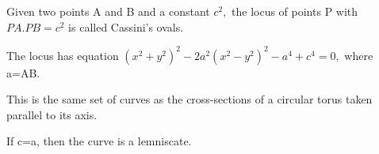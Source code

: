 Given two points A and B and a constant $c^{2},$  the locus of points P
with $PA.PB=c^{2}$  is called Cassini's ovals.
\par
The locus has equation $(x^{2}+y^{2})^{2}-2a^{2}(x^{2}-y^{2})^{2}-a^{4}+c^{4}=0,$ 
where a=AB.
\par
This is the same set of curves as the cross-sections of a
circular torus taken parallel to its axis.
\par
If c=a, then the curve is a lemniscate.